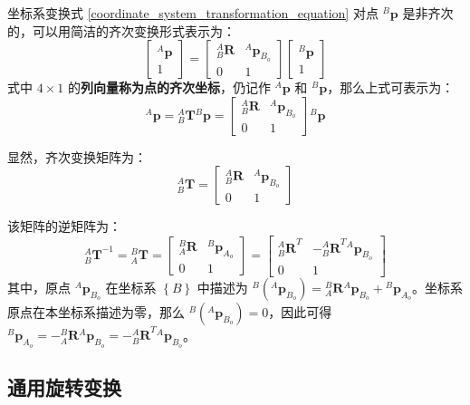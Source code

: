 \documentclass[cn,11pt,chinese,blue,bibstyle=ieeetr]{elegantbook}
\begin{document}
坐标系变换式 \ref{coordinate_system_transformation_equation} 对点 $^B\bm{p}$ 是非齐次的，可以用简洁的齐次变换形式表示为：
\begin{equation}\label{coordinate_system_homogeneous}
\begin{bmatrix}
^A\bm{p} \\
1
\end{bmatrix} = 
\begin{bmatrix}
_B^A\bm{R} & ^A\bm{p}_{B_o} \\
0 & 1
\end{bmatrix}
\begin{bmatrix}
^B\bm{p} \\
1
\end{bmatrix}
\end{equation}
式中 $4 \times 1$ 的\textbf{列向量称为点的齐次坐标}，仍记作 $^A\bm{p}$ 和 $^B\bm{p}$，那么上式可表示为：
\begin{equation}
^A\bm{p} = {_B^A\bm{T}}{^B\bm{p}} = 
\begin{bmatrix}
{_B^A\bm{R}} & ^A\bm{p}_{B_o} \\
0 & 1
\end{bmatrix}
{^B\bm{p}}
\end{equation}

显然，齐次变换矩阵为：
\begin{equation}
{_B^A\bm{T}} = 
\begin{bmatrix}
{_B^A\bm{R}} & {^A\bm{p}_{B_o}} \\
0 & 1
\end{bmatrix}
\end{equation}

该矩阵的逆矩阵为：
\begin{equation}
{_B^A\bm{T}}^{-1} = 
{_A^B\bm{T}} = 
\begin{bmatrix}
{_A^B\bm{R}} & ^B\bm{p}_{A_o} \\
0 & 1
\end{bmatrix} = 
\begin{bmatrix}
{_B^A\bm{R}}^T & -{_B^A\bm{R}}^{T}{^A\bm{p}}_{B_o} \\
0 & 1
\end{bmatrix}
\end{equation}
其中，原点 $^A\bm{p}_{B_o}$ 在坐标系 $\left\{B\right\}$ 中描述为 $^B\left({^A\bm{p}}_{B_o}\right) = {_A^B\bm{R}}{^A\bm{p}}_{B_o} + {^B\bm{p}}_{A_o}$。坐标系原点在本坐标系描述为零，那么 $^B\left({^A\bm{p}}_{B_o}\right) = 0$，因此可得 $^B\bm{p}_{A_o} = -{_A^B\bm{R}}{^A\bm{p}}_{B_o} = -{_B^A\bm{R}}^{T}{^A\bm{p}}_{B_o}$。


\subsection{通用旋转变换}
\end{document}
